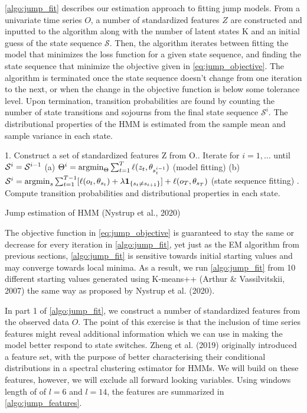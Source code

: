 \cref{algo:jump_fit} describes our estimation approach to fitting jump models. From a univariate time series $O$, a number of standardized features $Z$ are constructed and inputted to the algorithm along with the number of latent states K and an initial guess of the state sequence $\mathcal{S}$. Then, the algorithm iterates between fitting the model that minimizes the loss function for a given state sequence, and finding the state sequence that minimize the objective given in \cref{eq:jump_objective}. The algorithm is terminated once the state sequence doesn't change from one iteration to the next, or when the change in the objective function is below some tolerance level. Upon termination, transition probabilities are found by counting the number of state transitions and sojourns from the final state sequence $\mathcal{S}^i$. The distributional properties of the HMM is estimated from the sample mean and sample variance in each state.

\begin{algorithm}[H]
\BlankLine

1. Construct a set of standardized features Z from O.. Iterate for $i=1,\ldots$ until $\S^i=\S^{i-1}$ \;
\Indp
(a) $\Theta^i = \argmin_{\Theta} \sum_{t=1}^T \ell(z_t, \theta_{s_t^{i-1}})$ (model fitting)\;
(b) $\S^i = \argmin_s \sum_{t=1}^{T-1} [\ell(o_t, \theta_{s_t}) + \lambda\mathbf{1}_{\{ s_t\ne s_{t+1} \}}]
    + \ell(o_T, \theta_{s_T})$ (state sequence fitting)\;
. Compute transition probabilities and distributional properties in each state.\;
\BlankLine
{}

\caption{Jump estimation of HMM (Nystrup et al., 2020)}
\label{algo:jump_fit}
\end{algorithm}

The objective function in \cref{eq:jump_objective} is guaranteed to stay the same or decrease for every iteration in \cref{algo:jump_fit}, yet just as the EM algorithm from previous sections, \cref{algo:jump_fit} is sensitive towards initial starting values and may converge towards local minima. As a result, we run \cref{algo:jump_fit} from 10 different starting values generated using K-means++ (Arthur \& Vassilvitskii, 2007) the same way as proposed by Nystrup et al. (2020).

In part 1 of \cref{algo:jump_fit}, we construct a number of standardized features from the observed data $O$. The point of this exercise is that the inclusion of time series features might reveal additional information which we can use in making the model better respond to state switches. Zheng et al. (2019) originally introduced a feature set, with the purpose of better characterising their conditional distributions in a spectral clustering estimator for HMMs. We will build on these features, however, we will exclude all forward looking variables. Using windows length of of $l=6$ and $l=14$, the features are summarized in \cref{algo:jump_features}.

